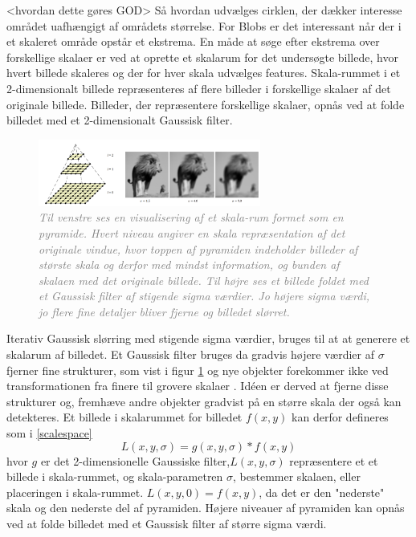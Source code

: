        \vspace{-2.5em}
\noindent
<hvordan dette gøres GOD>
Så hvordan udvælges cirklen, der dækker interesse området uafhængigt af områdets størrelse.  For Blobs er det interessant når der i et skaleret område opstår et ekstrema. En måde at søge efter ekstrema over forskellige skalaer er ved at oprette et skalarum for det undersøgte billede, hvor hvert billede skaleres og der for hver skala udvælges features. Skala-rummet i et 2-dimensionalt billede repræsenteres af flere billeder i forskellige skalaer af det originale billede. Billeder, der repræsentere forskellige skalaer, opnås ved at folde billedet med et 2-dimensionalt Gaussisk filter. 
\begin{figure}[H]
    \centering
    \includegraphics[width=0.65\textwidth]{fig/24.png}
    \vspace{-0.5em}   
    \begin{center}
    \caption{\textcolor{gray}{\footnotesize \textit{
Til venstre ses en visualisering af et skala-rum formet som en pyramide. Hvert niveau angiver en skala repræsentation af det originale vindue, hvor toppen af pyramiden indeholder billeder af største skala og derfor med mindst information, og bunden af skalaen med det originale billede. Til højre ses et billede foldet med et Gaussisk filter af stigende sigma værdier. Jo højere sigma værdi, jo flere fine detaljer bliver fjerne og billedet slørret.
    }}}
    \label{fig:mona}
     \end{center}
  \end{figure}
       \vspace{-2.5em}
\noindent
Iterativ Gaussisk slørring med stigende sigma værdier, bruges til at at generere et skalarum af billedet.
Et Gaussisk filter bruges da gradvis højere værdier af $\sigma$ fjerner fine strukturer, som vist i figur \ref{fig:mona} og nye objekter forekommer ikke ved transformationen fra finere til grovere skalaer \cite{lindenscale}. Idéen er derved at fjerne disse strukturer og, fremhæve andre objekter gradvist på en større skala der også kan detekteres.
Et billede i skalarummet for billedet $f(x,y)$ kan derfor defineres som i \eqref{scalespace}
\begin{equation}
L(x,y,\sigma) = g(x,y,\sigma)\ast f(x,y)
\label{scalespace}
\end{equation}
hvor $g$ er det 2-dimensionelle Gaussiske filter,$L(x,y,\sigma)$ repræsentere et et billede i skala-rummet, og skala-parametren $\sigma$, bestemmer skalaen, eller placeringen i skala-rummet. $L(x,y,0) = f(x,y)$, da det er den "nederste" skala og den nederste del af pyramiden. Højere niveauer af pyramiden kan opnås ved at folde billedet med et Gaussisk filter af større sigma værdi.

